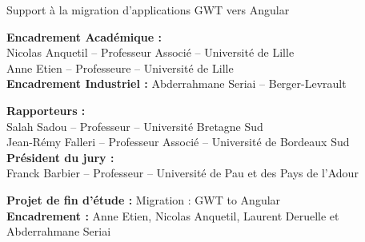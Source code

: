 \documentclass[10pt,a4paper,ragged2e,withhyper]{altacv}
\begin{document}

Support à la migration d'applications GWT vers Angular

\textbf{Encadrement Académique :}\\
Nicolas Anquetil -- Professeur Associé -- Université de Lille\\
Anne Etien -- Professeure -- Université de Lille\\
\textbf{Encadrement Industriel :} Abderrahmane Seriai -- Berger-Levrault


\textbf{Rapporteurs :}\\
Salah Sadou -- Professeur -- Université Bretagne Sud\\
Jean-Rémy Falleri -- Professeur Associé -- Université de Bordeaux Sud\\

\textbf{Président du jury :}\\
Franck Barbier -- Professeur -- Université de Pau et des Pays de l’Adour


\divider


\textbf{Projet de fin d'étude :} Migration : GWT to Angular\\
\textbf{Encadrement :} Anne Etien, Nicolas Anquetil, Laurent Deruelle et Abderrahmane Seriai

\divider





\divider


\divider




\end{document}
